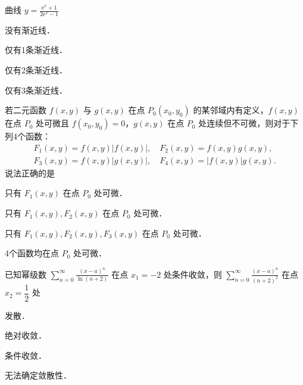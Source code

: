 
\begin{question}[index=1]
曲线 $\displaystyle y=\frac{\mathrm e^x+1}{2\mathrm e^x-1}$
\begin{choices}[columns=2]
\item 没有渐近线．
\item 仅有1条渐近线．
\item 仅有2条渐近线．
\item 仅有3条渐近线．
\end{choices}
\end{question}
\QuestionBreak

\begin{question}[index=2]
若二元函数 $f(x,y)$ 与 $g(x,y)$ 在点 $P_0(x_0,y_0)$ 的某邻域内有定义，$f(x,y)$ 在点 $P_0$ 处可微且 $f(x_0,y_0)=0$，$g(x,y)$ 在点 $P_0$ 处连续但不可微，则对于下列4个函数：
\[
\begin{gathered}
F_1(x,y)=f(x,y)|f(x,y)|,\quad F_2(x,y)=f(x,y)g(x,y),\\
F_3(x,y)=f(x,y)|g(x,y)|,\quad F_4(x,y)=|f(x,y)|g(x,y).
\end{gathered}
\]
说法正确的是
\begin{choices}[columns=1]
\item 只有 $F_1(x,y)$ 在点 $P_0$ 处可微．
\item 只有 $F_1(x,y),F_2(x,y)$ 在点 $P_0$ 处可微．
\item 只有 $F_1(x,y),F_2(x,y),F_3(x,y)$ 在点 $P_0$ 处可微．
\item 4个函数均在点 $P_0$ 处可微．
\end{choices}
\end{question}
\QuestionBreak

\begin{question}[index=3]
已知幂级数 $\displaystyle\sum_{n=0}^{\infty}\frac{(x-a)^n}{\ln(n+2)}$
在点 $x_1=-2$ 处条件收敛，则 $\displaystyle\sum_{n=0}^{\infty}\frac{(x-a)^n}{(n+2)^2}$ 在点 $x_2=\dfrac12$ 处
\begin{choices}[columns=2]
\item 发散．
\item 绝对收敛．
\item 条件收敛．
\item 无法确定敛散性．
\end{choices}
\end{question}
\QuestionBreak

